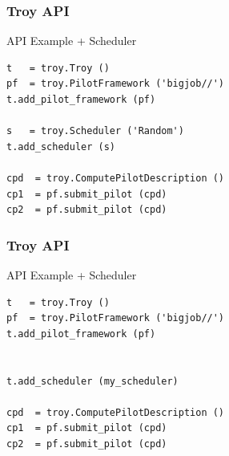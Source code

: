\documentclass{beamer}
\newcommand{\code}{
   \lstset{language=Python,basicstyle=\footnotesize,fancyvrb=true}
   \lstset{classoffset=0,
           keywords={},
           keywordstyle=\bf,
           stringstyle=\it}
}
\begin{document}
\begin{frame}[fragile] 
 \frametitle{Troy API}
 {\footnotesize
  \begin{block}{API Example + Scheduler}
   \begin{verbatim}
t   = troy.Troy ()
pf  = troy.PilotFramework ('bigjob//')
t.add_pilot_framework (pf)

s   = troy.Scheduler ('Random')
t.add_scheduler (s)

cpd  = troy.ComputePilotDescription ()
cp1  = pf.submit_pilot (cpd)
cp2  = pf.submit_pilot (cpd)
   \end{verbatim}
  \end{block}
 }
\end{frame}



%  
%  
%  


\begin{frame}[fragile] 
 \frametitle{Troy API}
 {\footnotesize
   \begin{block}{API Example + Scheduler}
  \begin{verbatim}
t   = troy.Troy ()
pf  = troy.PilotFramework ('bigjob//')
t.add_pilot_framework (pf)


t.add_scheduler (my_scheduler)

cpd  = troy.ComputePilotDescription ()
cp1  = pf.submit_pilot (cpd)
cp2  = pf.submit_pilot (cpd)
   \end{verbatim}
  \end{block}
 }
\end{frame}
\end{document}
